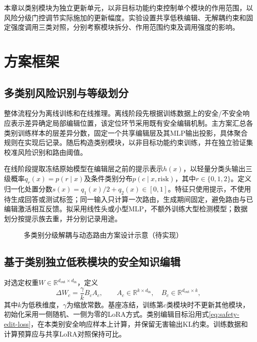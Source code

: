 本章以类别模块为独立更新单元，以非目标功能约束控制单个模块的作用范围，以风险分级门控调节实际施加的更新幅度。实验设置共享低秩编辑、无解耦约束和固定强度调用三类对照，分别考察模块拆分、作用范围约束及调用强度的影响。

\section{方案框架}
\subsection{多类别风险识别与等级划分}

整体流程分为离线训练和在线推理。离线阶段先根据训练数据上的安全/不安全响应表示差异确定局部编辑位置，该定位环节采用既有安全编辑机制\cite{wang2024safeedit}。主方案汇总各类别训练样本的层差异分数，固定一个共享编辑层及其MLP输出投影，具体聚合规则在实现后记录。随后构造类别模块，以非目标功能约束训练，并在独立验证集校准风险识别和路由阈值。

在线阶段提取冻结原始模型在编辑层之前的提示表示$h(x)$，以轻量分类头输出三级概率$q_r(x)=p(r\mid x)$及条件类别分布$p(c\mid x,\mathrm{risk})$，其中$r\in\{0,1,2\}$。定义归一化处置分数$s(x)=q_1(x)/2+q_2(x)\in[0,1]$。特征只使用提示，不使用待生成回答或测试标签；同一输入只计算一次路由，生成期间固定，避免路由与已编辑激活相互反馈。拟采用线性头或小型MLP，不额外训练大型检测模型；数据划分按提示族去重，并分别记录用途。

\begin{figure}[htbp]
 \centering
 \caption{多类别分级解耦与动态路由方案设计示意（待实现）}
 \label{fig:ch3-framework}
\end{figure}

\subsection{基于类别独立低秩模块的安全知识编辑}

对选定权重$W\in\mathbb R^{d_{\mathrm{out}}\times d_{\mathrm{in}}}$，定义
\begin{equation}
 \Delta W_c=\frac{\gamma}{k}B_cA_c,\qquad
 A_c\in\mathbb R^{k\times d_{\mathrm{in}}},\quad
 B_c\in\mathbb R^{d_{\mathrm{out}}\times k},
 \label{eq:ch3-lora}
\end{equation}
其中$k$为低秩维度，$\gamma$为缩放常数。基座冻结，训练第$c$类模块时不更新其他模块，初始化采用一侧随机、一侧为零的LoRA方式。类别编辑目标沿用式\eqref{eq:safety-edit-loss}，在本类别安全响应样本上计算，并保留无害输出KL约束。训练数据和计算预算应与共享LoRA对照保持可比。

